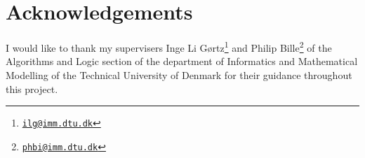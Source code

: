 \chapter{Acknowledgements}

I would like to thank my supervisers Inge Li
Gørtz\footnote{\href{mailto:ilg@imm.dtu.dk}{\nolinkurl{ilg@imm.dtu.dk}}} and
Philip
Bille\footnote{\href{mailto:phbi@imm.dtu.dk}{\nolinkurl{phbi@imm.dtu.dk}}} of
the Algorithms and Logic section of the department of Informatics and
Mathematical Modelling of the Technical University of Denmark for their guidance
throughout this project.
